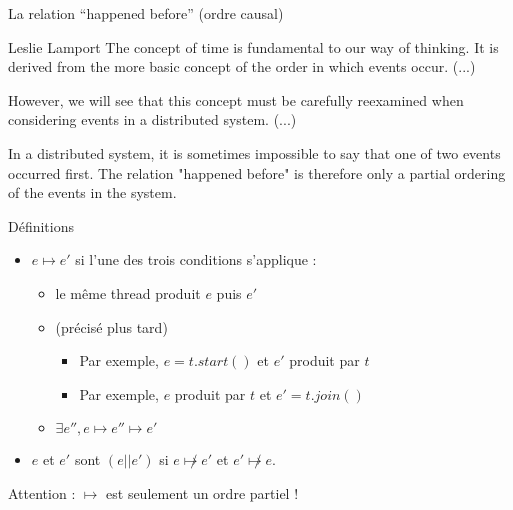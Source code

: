 
\begingroup

\begin{frame}{La relation ``happened before'' (ordre causal)}

  \begin{shadequote}{Leslie Lamport}
    The \alert{concept of time} is fundamental to our way of
    thinking. \alert{It is derived} from the more basic concept of
    the \alert{order in which events occur}. (...)

    However, we will see that this concept must be carefully reexamined when considering events in a distributed system. (...)

    In a distributed system, it is sometimes impossible to
    say that one of two events occurred first. \alert{The relation
      "happened before" is therefore only a partial ordering
      of the events in the system.}
  \end{shadequote}

  \begin{block}{Définitions}
    \begin{itemize}
    \item $e\mapsto e'$ si l'une des trois conditions s'applique :    
      \begin{itemize}
      \item {} le même thread produit $e$ puis $e'$
      \item {} (précisé plus tard)
        \begin{itemize}
        \item Par exemple, $e = t.start()$ et $e'$ produit par $t$
        \item Par exemple, $e$ produit par $t$ et $e' = t.join()$
        \end{itemize}
      \item {} $\exists e'', e\mapsto e'' \mapsto e'$
      \end{itemize}
    \item $e$ et $e'$ sont  $(e || e')$ si $e\not\mapsto e'$ et $e'\not\mapsto e$.
    \end{itemize}
  \end{block}
  \alert{Attention :} $\mapsto$ est seulement un ordre \alert{partiel} !


\end{frame}

\endgroup
\endinput
